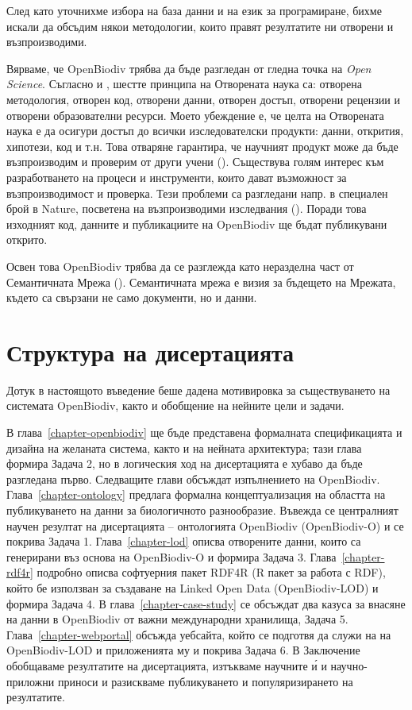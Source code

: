 След като уточнихме избора на база данни и на език за програмиране, бихме искали да обсъдим някои методологии, които правят резултатите ни отворени и възпроизводими.

Вярваме, че OpenBiodiv трябва да бъде разгледан от гледна точка на \emph{Open Science}. Съгласно \cite {kraker_case_2011} и \cite{noauthor_was_nodate}, шестте принципа на Отворената наука са: отворена методология, отворен код, отворени данни, отворен достъп, отворени рецензии и отворени образователни ресурси. Моето убеждение е, че целта на Отворената наука е да осигури достъп до всички изследователски продукти: данни, открития, хипотези, код и т.н. Това отваряне гарантира, че научният продукт може да бъде възпроизводим и проверим от други учени (\cite{mietchen_transformative_2014}). Съществува голям интерес към разработването на процеси и инструменти, които дават възможност за възпроизводимост и проверка. Тези проблеми са разгледани напр. в специален брой в Nature, посветена на възпроизводими изследвания (\cite {noauthor_challenges_2010}). Поради това изходният код, данните и публикациите на OpenBiodiv ще бъдат публикувани открито.

Освен това OpenBiodiv трябва да се разглежда като неразделна част от Семантичната Мрежа (\cite{berners-lee_semantic_2001}). Семантичната мрежа е визия за бъдещето на Мрежата, където са свързани не само документи, но и данни.

\section*{Структура на дисертацията}

Дотук в настоящото въведение беше дадена мотивировка за съществуването на системата OpenBiodiv, както и обобщение на нейните цели и задачи.

В глава~\ref{chapter-openbiodiv} ще бъде представена формалната спецификацията и дизайна на желаната система, както и на нейната архитектура; тази глава формира Задача 2, но в логическия ход на дисертацията е хубаво да бъде разгледана първо. Следващите глави обсъждат изпълнението на OpenBiodiv. Глава~\ref{chapter-ontology} предлага формална концептуализация на областта на публикуването на данни за биологичното разнообразие. Въвежда се централният научен резултат на дисертацията -- онтологията OpenBiodiv (OpenBiodiv-O) и се покрива Задача 1. Глава~\ref{chapter-lod} описва отворените данни, които са генерирани въз основа на OpenBiodiv-O и формира Задача 3. Глава~\ref{chapter-rdf4r} подробно описва софтуерния пакет RDF4R (R пакет за работа с RDF), който бе използван за създаване на Linked Open Data (OpenBiodiv-LOD) и формира Задача 4. В глава~\ref{chapter-case-study} се обсъждат два казуса за внасяне на данни в OpenBiodiv от важни международни хранилища, Задача 5. Глава~\ref{chapter-webportal} обсъжда уебсайта, който се подготвя да служи на на OpenBiodiv-LOD и приложенията му и покрива Задача 6.
В Заключение обобщаваме резултатите на дисертацията, изтъкваме научните \'{и} и научно-приложни приноси и разискваме публикуването и популяризирането на резултатите.





